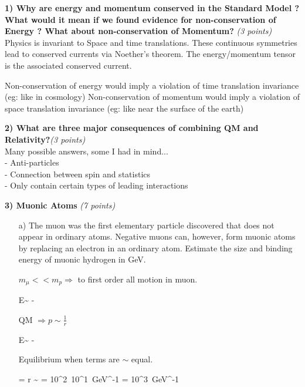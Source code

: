 {\large


\textbf{1) Why are energy and momentum conserved in the Standard Model ?  What would it mean if we found evidence for non-conservation of Energy ? What about non-conservation of Momentum? }\hfill \textit{(3 points)}\\

Physics is invariant to Space and time translations. 
These continuous symmetries lead to conserved currents via Noether's theorem.
The energy/momentum tensor is the associated conserved current. 

Non-conservation of energy would imply a violation of time translation invariance (eg: like in cosmology) 
Non-conservation of momentum would imply a violation of space translation invariance (eg: like near the surface of the earth)  

\vspace*{0.3in}

\textbf{2) What are three major consequences of combining QM and Relativity?}\hfill \textit{(3 points)}\\

Many possible answers, some I had in mind...\\
- Anti-particles\\
- Connection between spin and statistics\\
- Only contain certain types of leading interactions

\vspace*{0.3in}

\textbf{3) Muonic Atoms } \hfill \textit{(7 points)}\\
\begin{itemize}
\item[a)] The muon was the first elementary particle discovered that does not appear in ordinary atoms.  Negative muons can, however, form muonic atoms by replacing an electron in an ordinary atom. 
Estimate the size and binding energy of muonic hydrogen in GeV.

$m_\mu << m_p \Rightarrow $ to first order all motion in muon. 

\be
E\sim {} -  
\ee


QM $\Rightarrow  p \sim \frac{1}{r}$ 


\be
E\sim {} -  
\ee

Equilibrium when terms are $\sim$ equal.

\be
{} =  \Rightarrow r \sim {} = 10^2\ 10^1\ GeV^{-1} = 10^3\ GeV^{-1}
\ee


\end{itemize}}
